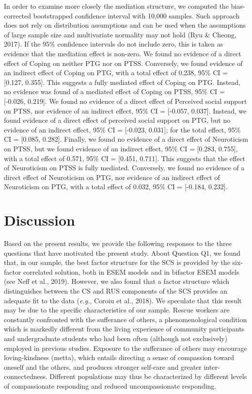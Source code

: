\documentclass[
  english,
  man,floatsintext]{apa7}
\begin{document}
In order to examine more closely the mediation structure, we computed the bias-corrected bootstrapped confidence interval with 10,000 samples. Such approach does not rely on distribution assumptions and can be used when the assumptions of large sample size and multivariate normality may not hold (Ryu \& Cheong, 2017). If the 95\% confidence intervals do not include zero, this is taken as evidence that the mediation effect is non-zero. We found no evidence of a direct effect of Coping on neither PTG nor on PTSS. Conversely, we found evidence of an indirect effect of Coping on PTG, with a total effect of 0.238, 95\% CI = {[}0.127, 0.355{]}. This suggests a fully mediated effect of Coping on PTG. Instead, no evidence was found of a mediated effect of Coping on PTSS, 95\% CI = {[}-0.026, 0.219{]}. We found no evidence of a direct effect of Perceived social support on PTSS, nor evidence of an indirect effect, 95\% CI = {[}-0.057, 0.037{]}. Instead, we found evidence of a direct effect of perceived social support on PTG, but no evidence of an indirect effect, 95\% CI = {[}-0.023, 0.031{]}; for the total effect, 95\% CI = {[}0.085, 0.282{]}. Finally, we found no evidence of a direct effect of Neuroticism on PTSS, but we found evidence of an indirect effect, 95\% CI = {[}0.283, 0.755{]}, with a total effect of 0.571, 95\% CI = {[}0.451, 0.711{]}. This suggests that the effect of Neuroticism on PTSS is fully mediated. Conversely, we found no evidence of a direct effect of Neuroticism on PTG, nor evidence of an indirect effect of Neuroticism on PTG, with a total effect of 0.032, 95\% CI = {[}-0.184, 0.232{]}.

\hypertarget{discussion}{%
\section{Discussion}\label{discussion}}

Based on the present results, we provide the following responses to the three questions that have motivated the present study. About Question Q1, we found that, in our sample, the best factor structure for the SCS is provided by the six-factor correlated solution, both in ESEM models and in bifactor ESEM models (see Neff et al., 2019). However, we also found that a factor structure which distinguishes between the CS and RUS components of the SCS provides an adequate fit to the data (\emph{e.g.}, Coroiu et al., 2018). We speculate that this result may be due to the specific characteristics of our sample. Rescue workers are constantly confronted with the sufferance of others, a phenomenological condition which is markedly different from the living experience of community participants and undergraduate students who had been often (although not exclusively) employed in previous studies. Exposure to the sufferance of others may encourage loving-kindness (metta), which entails directing a sense of compassion toward oneself and the others, and produces stronger self-care and greater inter-connectedness. Different populations may thus be characterized by different levels of compassionate responding and reduced uncompassionate responding.
\end{document}
